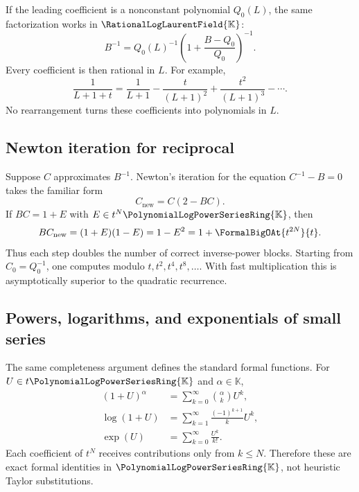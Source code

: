 \documentclass[11pt]{article}
\theoremstyle{pltheorem}
\newcommand{\K}{\mathbb K}
\newcommand{\PL}{\PolynomialLogPowerSeriesRing{\K}}
\newcommand{\QPL}{\RationalLogLaurentField{\K}}
\begin{document}
If the leading coefficient is a nonconstant polynomial \(Q_0(L)\), the same factorization works in \(\QPL\):
\begin{equation}\label{eq:rational-leading-reciprocal}
 B^{-1}=Q_0(L)^{-1}
 \left(1+\frac{B-Q_0}{Q_0}\right)^{-1}.
\end{equation}
Every coefficient is then rational in \(L\).  For example,
\begin{equation}\label{eq:nonclosure-example}
 \frac1{L+1+t}
 =\frac1{L+1}-\frac{t}{(L+1)^2}
 +\frac{t^2}{(L+1)^3}-\cdots.
\end{equation}
No rearrangement turns these coefficients into polynomials in \(L\).

\subsection{Newton iteration for reciprocal}

Suppose \(C\) approximates \(B^{-1}\).  Newton's iteration for the equation
\(C^{-1}-B=0\) takes the familiar form
\begin{equation}\label{eq:newton-reciprocal}
 C_{\mathrm{new}}=C(2-BC).
\end{equation}
If
\(BC=1+E\) with \(E\in t^N\PL\), then
\begin{equation}\label{eq:newton-reciprocal-error}
 BC_{\mathrm{new}}=(1+E)(1-E)=1-E^2
 =1+\FormalBigOAt{t^{2N}}{t}.
\end{equation}
Thus each step doubles the number of correct inverse-power blocks.  Starting from \(C_0=Q_0^{-1}\), one computes modulo \(t,t^2,t^4,t^8,\ldots\).  With fast multiplication this is asymptotically superior to the quadratic recurrence.

\subsection{Powers, logarithms, and exponentials of small series}

The same completeness argument defines the standard formal functions.  For
\(U\in t\PL\) and \(\alpha\in\K\),
\begin{align}
 (1+U)^\alpha
 &=\sum_{k=0}^{\infty}\binom{\alpha}{k}U^k,
 \label{eq:binomial-small}\\
 \log(1+U)
 &=\sum_{k=1}^{\infty}\frac{(-1)^{k+1}}{k}U^k,
 \label{eq:log-small}\\
 \exp(U)
 &=\sum_{k=0}^{\infty}\frac{U^k}{k!}.
 \label{eq:exp-small}
\end{align}
Each coefficient of \(t^N\) receives contributions only from \(k\le N\).  Therefore these are exact formal identities in \(\PL\), not heuristic Taylor substitutions.
\end{document}
